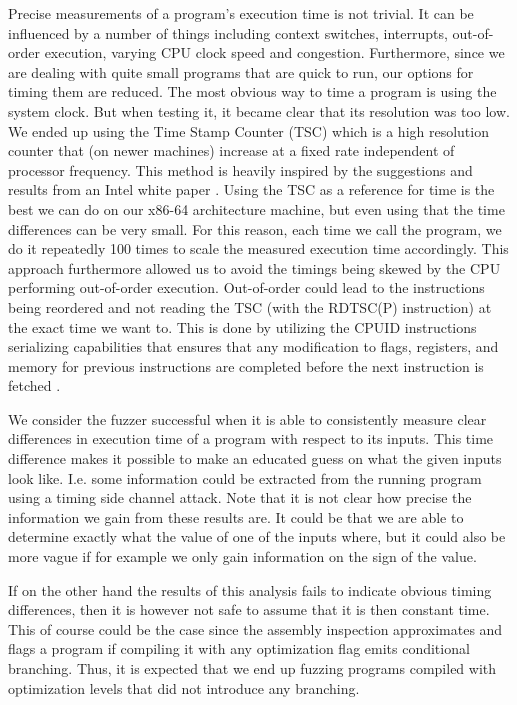 Precise measurements of a program's execution time is not trivial. It can be influenced by a number of things including context switches, interrupts, out-of-order execution, varying CPU clock speed and congestion. Furthermore, since we are dealing with quite small programs that are quick to run, our options for timing them are reduced. The most obvious way to time a program is using the system clock. But when testing it, it became clear that its resolution was too low. We ended up using the Time Stamp Counter (TSC) which is a high resolution counter that (on newer machines) increase at a fixed rate independent of processor frequency. This method is heavily inspired by the suggestions and results from an Intel white paper \citep{intel-benchmark-code-execution}. Using the TSC as a reference for time is the best we can do on our x86-64 architecture machine, but even using that the time differences can be very small. For this reason, each time we call the program, we do it repeatedly 100 times to scale the measured execution time accordingly. This approach furthermore allowed us to avoid the timings being skewed by the CPU performing out-of-order execution. Out-of-order could lead to the instructions being reordered and not reading the TSC (with the RDTSC(P) instruction) at the exact time we want to. This is done by utilizing the CPUID instructions serializing capabilities that ensures that any modification to flags, registers, and memory for previous instructions are completed before the next instruction is fetched .


We consider the fuzzer successful when it is able to consistently measure clear differences in execution time of a program with respect to its inputs. This time difference makes it possible to make an educated guess on what the given inputs look like. I.e. some information could be extracted from the running program using a timing side channel attack. Note that it is not clear how precise the information we gain from these results are. It could be that we are able to determine exactly what the value of one of the inputs where, but it could also be more vague if for example we only gain information on the sign of the value.

If on the other hand the results of this analysis fails to indicate obvious timing differences, then it is however not safe to assume that it is then constant time. This of course could be the case since the assembly inspection approximates and flags a program if compiling it with any optimization flag emits conditional branching. Thus, it is expected that we end up fuzzing programs compiled with optimization levels that did not introduce any branching.



